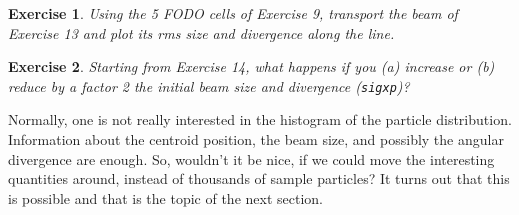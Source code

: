 \documentclass{article}
\newtheorem{exercise}{Exercise}
\begin{document}
\begin{exercise}
Using the 5 FODO cells of Exercise 9, transport the beam of Exercise 13 and plot its rms size and divergence along the line.
\end{exercise}

\begin{exercise}
Starting from Exercise 14, what happens if you (a) increase or (b) reduce by a factor 2 the initial beam size and divergence ({\tt sigxp})?
\end{exercise}
Normally, one is not really interested in the histogram of the particle distribution.
Information about the centroid position, the beam size, and possibly the angular 
divergence are enough. So, wouldn't it be nice, 
if we could move the interesting quantities around, instead of thousands of sample
particles? It turns out that this is possible and that is the topic of the next section.
%
%
\end{document}
